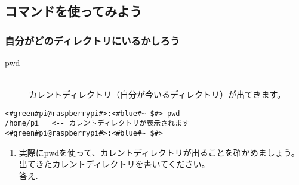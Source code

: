 \subsection{コマンドを使ってみよう}
\subsubsection{自分がどのディレクトリにいるかしろう}

\begin{description}
\item[pwd]\mbox{}\\
 カレントディレクトリ（自分が今いるディレクトリ）が出てきます。
\end{description}

\begin{lstlisting}[caption=pwdコマンドの例,label=pwdtest]
<#green#pi@raspberrypi#>:<#blue#~ $#> pwd
/home/pi   <-- カレントディレクトリが表示されます
<#green#pi@raspberrypi#>:<#blue#~ $#>
\end{lstlisting}

\begin{tcolorbox}[title=\useOmetoi]
\begin{enumerate}
 \item 実際にpwdを使って、カレントディレクトリが出ることを確かめましょう。出てきたカレントディレクトリを書いてください。\\
\underline{答え.\hspace{0.8\linewidth}}
\end{enumerate}
\end{tcolorbox}

